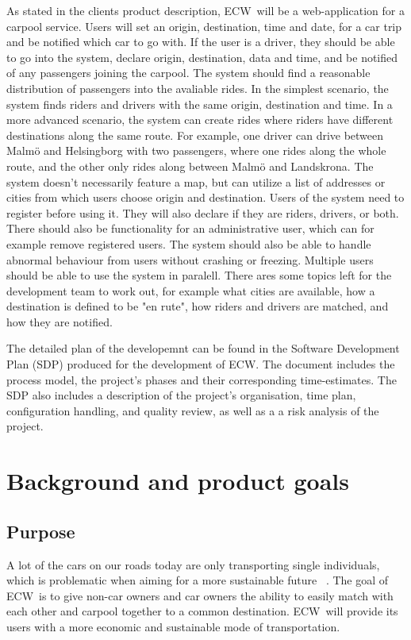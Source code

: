 \documentclass{article}
\newcommand{\name}{ECW\ }
\newcommand{\nameNospace}{ECW}
\begin{document}
As stated in the clients product description\cite{PH}, \name will be a web-application for a carpool service. Users will set an origin, destination, time and date, for a car trip and be notified which car to go with. If the user is a driver, they should be able to go into the system, declare origin, destination, data and time, and be notified of any passengers joining the carpool. The system should find a reasonable distribution of passengers into the avaliable rides. In the simplest scenario, the system finds riders and drivers with the same origin, destination and time. In a more advanced scenario, the system can create rides where riders have different destinations along the same route. For example, one driver can drive between Malmö and Helsingborg with two passengers, where one rides along the whole route, and the other only rides along between Malmö and Landskrona. The system doesn't necessarily feature a map, but can utilize a list of addresses or cities from which users choose origin and destination. Users of the system need to register before using it. They will also declare if they are riders, drivers, or both. There should also be functionality for an administrative user, which can for example remove registered users. The system should also be able to handle abnormal behaviour from users without crashing or freezing. Multiple users should be able to use the system in paralell. There ares some topics left for the development team to work out, for example what cities are available, how a destination is defined to be "en rute", how riders and drivers are matched, and how they are notified.

The detailed plan of the developemnt can be found in the Software Development Plan (SDP) produced for the development of \nameNospace. The document includes the process model, the project's phases and their corresponding time-estimates. The SDP also includes a description of the project's organisation, time plan, configuration handling, and quality review, as well as a a risk analysis of the project\cite{SDP}.

\section{Background and product goals}
\subsection{Purpose}
A lot of the cars on our roads today are only transporting single individuals, which is problematic when aiming for a more sustainable future ~\cite{BNL}. The goal of \name is to give non-car owners and car owners the ability to easily match with each other and carpool together to a common destination. \name will provide its users with a more economic and sustainable mode of transportation.
\end{document}
